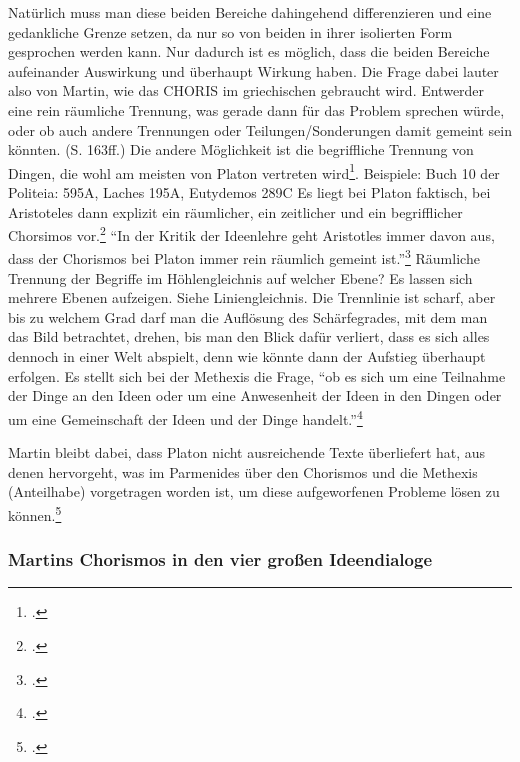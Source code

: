 \documentclass[12pt]{article}
\begin{document}
Natürlich muss man diese beiden Bereiche dahingehend differenzieren und eine gedankliche Grenze setzen, da nur so von beiden in ihrer isolierten Form gesprochen werden kann. Nur dadurch ist es möglich, dass die beiden Bereiche aufeinander Auswirkung und überhaupt Wirkung haben.
Die Frage dabei lauter also von Martin, wie das CHORIS im griechischen gebraucht wird. Entwerder eine rein räumliche Trennung, was gerade dann für das Problem sprechen würde, oder ob auch andere Trennungen oder Teilungen/Sonderungen damit gemeint sein könnten. (S. 163ff.)
Die andere Möglichkeit ist die begriffliche Trennung von Dingen, die wohl am meisten von Platon vertreten wird\footcite[vgl.][S. 165]{Martin73}. Beispiele: Buch 10 der Politeia: 595A, Laches 195A, Eutydemos 289C
Es liegt bei Platon faktisch, bei Aristoteles dann explizit ein räumlicher, ein zeitlicher und ein begrifflicher Chorsimos vor.\footcite[vgl.][S. 166]{Martin73}
\enquote{In der Kritik der Ideenlehre geht Aristotles immer davon aus, dass der Chorismos bei Platon immer rein räumlich gemeint ist.}\footcite[][S. 166]{Martin73}
Räumliche Trennung der Begriffe im Höhlengleichnis auf welcher Ebene? Es lassen sich mehrere Ebenen aufzeigen. Siehe Liniengleichnis. Die Trennlinie ist scharf, aber bis zu welchem Grad darf man die Auflösung des Schärfegrades, mit dem man das Bild betrachtet, drehen, bis man den Blick dafür verliert, dass es sich alles dennoch in einer Welt abspielt, denn wie könnte dann der Aufstieg überhaupt erfolgen.
Es stellt sich bei der Methexis die Frage, \enquote{ob es sich um eine Teilnahme der Dinge an den Ideen oder um eine Anwesenheit der Ideen in den Dingen oder um eine Gemeinschaft der Ideen und der Dinge handelt.}\footcite[vgl.][S. 170]{Martin73}

Martin bleibt dabei, dass Platon nicht ausreichende Texte überliefert hat, aus denen hervorgeht, was im Parmenides über den Chorismos und die Methexis (Anteilhabe) vorgetragen worden ist, um diese aufgeworfenen Probleme lösen zu können.\footcite[vgl.][S. 173f.]{Martin73}
\subsubsection*{Martins Chorismos in den vier großen Ideendialoge}
\end{document}
